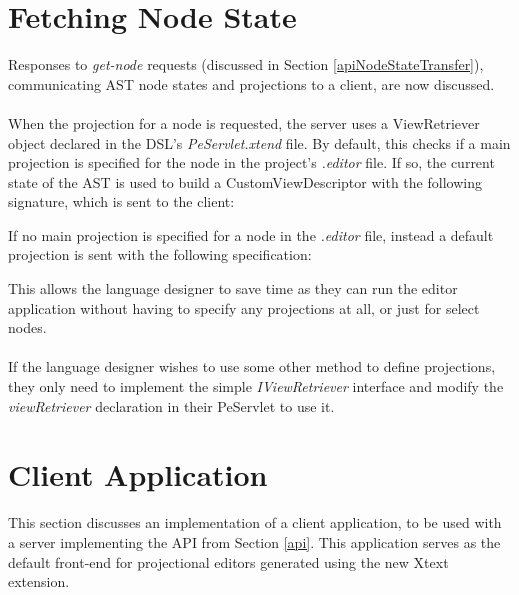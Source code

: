 \documentclass{article}
\begin{document}
{\section{Fetching Node State}\label{viewObject}
Responses to \emph{get-node} requests (discussed in Section \ref{apiNodeStateTransfer}), communicating AST node states and projections to a client, are now discussed. 
%
\\
\\
When the projection for a node is requested, the server uses a ViewRetriever object declared in the DSL's \emph{PeServlet.xtend} file. By default, this checks if a main projection is specified for the node in the project's \emph{.editor} file. If so, the current state of the AST is used to build a CustomViewDescriptor with the following signature, which is sent to the client: 

\vspace*{0.1cm}
If no main projection is specified for a node in the \emph{.editor} file, instead a default projection is sent with the following specification: 

This allows the language designer to save time as they can run the editor application without having to specify any projections at all, or just for select nodes. 
\\
\\
If the language designer wishes to use some other method to define projections, they only need to implement the simple \emph{IViewRetriever} interface and modify the \emph{viewRetriever} declaration in their PeServlet to use it.


\section{Client Application}\label{clientApp}
This section discusses an implementation of a client application, to be used with a server implementing the API from Section \ref{api}. This application serves as the default front-end for projectional editors generated using the new Xtext extension. 

}
\end{document}
